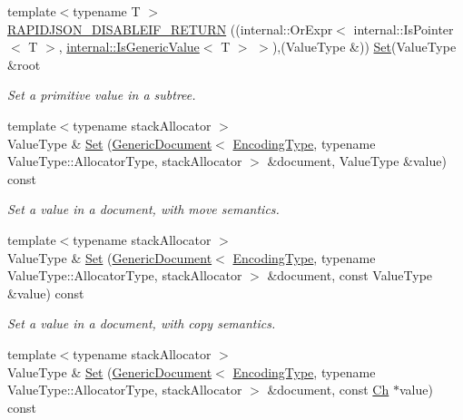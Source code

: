 \begin{DoxyCompactItemize}
{\footnotesize template$<$typename T $>$ }\\\hyperlink{classGenericPointer_a914bbdd96e2a248e035b8ebd68526369}{R\+A\+P\+I\+D\+J\+S\+O\+N\+\_\+\+D\+I\+S\+A\+B\+L\+E\+I\+F\+\_\+\+R\+E\+T\+U\+RN} ((internal\+::\+Or\+Expr$<$ internal\+::\+Is\+Pointer$<$ T $>$, \hyperlink{structinternal_1_1IsGenericValue}{internal\+::\+Is\+Generic\+Value}$<$ T $>$ $>$),(Value\+Type \&)) \hyperlink{classGenericPointer_a71476d125a276b62a246990da1bd3468}{Set}(Value\+Type \&root
\begin{DoxyCompactList}\small\item\em Set a primitive value in a subtree. \end{DoxyCompactList}\item 
\mbox{\label{classGenericPointer_aeec3daf051dfa8b8fbf23ea4f9a238e4}} 
{\footnotesize template$<$typename stack\+Allocator $>$ }\\Value\+Type \& \hyperlink{classGenericPointer_aeec3daf051dfa8b8fbf23ea4f9a238e4}{Set} (\hyperlink{classGenericDocument}{Generic\+Document}$<$ \hyperlink{classGenericPointer_a4b802da797a7a0b615fd9611cedb7c3b}{Encoding\+Type}, typename Value\+Type\+::\+Allocator\+Type, stack\+Allocator $>$ \&document, Value\+Type \&value) const
\begin{DoxyCompactList}\small\item\em Set a value in a document, with move semantics. \end{DoxyCompactList}\item 
\mbox{\label{classGenericPointer_a8ed0a7ce95331b7433371df7150b84a9}} 
{\footnotesize template$<$typename stack\+Allocator $>$ }\\Value\+Type \& \hyperlink{classGenericPointer_a8ed0a7ce95331b7433371df7150b84a9}{Set} (\hyperlink{classGenericDocument}{Generic\+Document}$<$ \hyperlink{classGenericPointer_a4b802da797a7a0b615fd9611cedb7c3b}{Encoding\+Type}, typename Value\+Type\+::\+Allocator\+Type, stack\+Allocator $>$ \&document, const Value\+Type \&value) const
\begin{DoxyCompactList}\small\item\em Set a value in a document, with copy semantics. \end{DoxyCompactList}\item 
\mbox{\label{classGenericPointer_abaa0cda4ed84a4435871d355279bab8e}} 
{\footnotesize template$<$typename stack\+Allocator $>$ }\\Value\+Type \& \hyperlink{classGenericPointer_abaa0cda4ed84a4435871d355279bab8e}{Set} (\hyperlink{classGenericDocument}{Generic\+Document}$<$ \hyperlink{classGenericPointer_a4b802da797a7a0b615fd9611cedb7c3b}{Encoding\+Type}, typename Value\+Type\+::\+Allocator\+Type, stack\+Allocator $>$ \&document, const \hyperlink{classGenericPointer_ab292356c11b4015c98d21b966b11f285}{Ch} $\ast$value) const

\end{DoxyCompactItemize}
